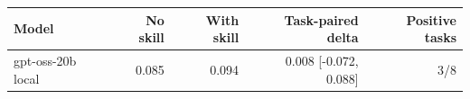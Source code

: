\begin{tabular}{lrrrr}
\toprule
Model & No skill & With skill & Task-paired delta & Positive tasks \\
\midrule
gpt-oss-20b local & 0.085 & 0.094 & 0.008 [-0.072, 0.088] & 3/8 \\
\bottomrule
\end{tabular}
